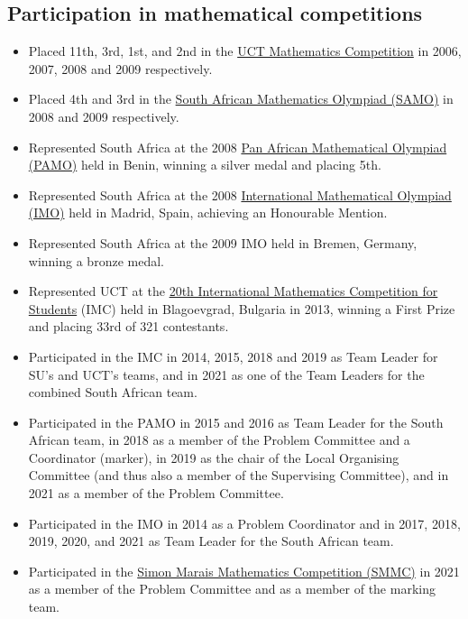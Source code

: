 \documentclass{article}
\begin{document}
\subsection{Participation in mathematical competitions}
\begin{itemize}
	\item Placed 11th, 3rd, 1st, and 2nd in the \href{http://www.mth.uct.ac.za/competition/}{UCT Mathematics Competition} in 2006, 2007, 2008 and 2009 respectively.
	\item Placed 4th and 3rd in the \href{http://www.samf.ac.za/sa-mathematics-olympiad}{South African Mathematics Olympiad (SAMO)} in 2008 and 2009 respectively.
	\item Represented South Africa at the 2008 \href{https://www.africamathunion.org/AMU-pamo-official.php}{Pan African Mathematical Olympiad (PAMO)} held in Benin, winning a silver medal and placing 5th.
	\item Represented South Africa at the 2008 \href{http://imo-official.org/}{International Mathematical Olympiad (IMO)} held in Madrid, Spain, achieving an Honourable Mention.
	\item Represented South Africa at the 2009 IMO held in Bremen, Germany, winning a bronze medal.
	\item Represented UCT at the \href{http://www.imc-math.org.uk/index.php?year=2013}{20th International Mathematics Competition for Students} (IMC) held in Blagoevgrad, Bulgaria in 2013, winning a First Prize and placing 33rd of 321 contestants.
	\item Participated in the IMC in 2014, 2015, 2018 and 2019 as Team Leader for SU's and UCT's teams, and in 2021 as one of the Team Leaders for the combined South African team.
	\item Participated in the PAMO in 2015 and 2016 as Team Leader for the South African team, in 2018 as a member of the Problem Committee and a Coordinator (marker), in 2019 as the chair of the Local Organising Committee (and thus also a member of the Supervising Committee), and in 2021 as a member of the Problem Committee.
	\item Participated in the IMO in 2014 as a Problem Coordinator and in 2017, 2018, 2019, 2020, and 2021 as Team Leader for the South African team.
	\item Participated in the \href{http://www.simonmarais.org/}{Simon Marais Mathematics Competition (SMMC)} in 2021 as a member of the Problem Committee and as a member of the marking team.
\end{itemize}
\end{document}
